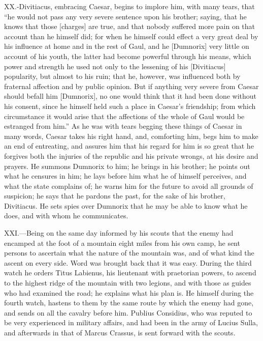 XX.-Divitiacus, embracing Caesar, begins to implore him, with many
tears, that ``he would not pass any very severe sentence upon his
brother; saying, that he knows that those [charges] are true, and that
nobody suffered more pain on that account than he himself did; for when
he himself could effect a very great deal by his influence at home and
in the rest of Gaul, and he [Dumnorix] very little on account of his
youth, the latter had become powerful through his means, which power and
strength he used not only to the lessening of his [Divitiacus]
popularity, but almost to his ruin; that he, however, was influenced
both by fraternal affection and by public opinion. But if anything very
severe from Caesar should befall him [Dumnorix], no one would think that
it had been done without his consent, since he himself held such a place
in Caesar's friendship; from which circumstance it would arise that the
affections of the whole of Gaul would be estranged from him.'' As he was
with tears begging these things of Caesar in many words, Caesar takes
his right hand, and, comforting him, begs him to make an end of
entreating, and assures him that his regard for him is so great that he
forgives both the injuries of the republic and his private wrongs, at
his desire and prayers. He summons Dumnorix to him; he brings in his
brother; he points out what he censures in him; he lays before him what
he of himself perceives, and what the state complains of; he warns him
for the future to avoid all grounds of suspicion; he says that he
pardons the past, for the sake of his brother, Divitiacus. He sets spies
over Dumnorix that he may be able to know what he does, and with whom he
communicates.

XXI.—Being on the same day informed by his scouts that the enemy had
encamped at the foot of a mountain eight miles from his own camp, he
sent persons to ascertain what the nature of the mountain was, and of
what kind the ascent on every side. Word was brought back that it was
easy. During the third watch he orders Titus Labienus, his lieutenant
with praetorian powers, to ascend to the highest ridge of the mountain
with two legions, and with those as guides who had examined the road; he
explains what his plan is. He himself during the fourth watch, hastens
to them by the same route by which the enemy had gone, and sends on all
the cavalry before him. Publius Considius, who was reputed to be very
experienced in military affairs, and had been in the army of Lucius
Sulla, and afterwards in that of Marcus Crassus, is sent forward with
the scouts.

